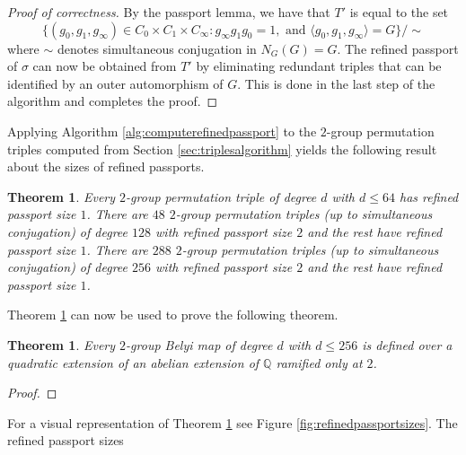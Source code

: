 \documentclass{dcthesis}
\newcommand{\QQ}{\mathbb Q}
\numberwithin{equation}{section}
\newtheorem{theorem}[equation]{Theorem}
\theoremstyle{definition}
\theoremstyle{remark}
\begin{document}
{{{\begin{proof}[Proof of correctness]
      By the passport lemma,
      we have that $T'$ is equal to the set
      \begin{equation}
        \label{eqn:innerauts}
        \{
          (g_0,g_1,g_\infty)\in C_0\times C_1\times C_\infty :
          g_\infty g_1 g_0 = 1,\text{ and }
          \langle g_0,g_1,g_\infty\rangle = G
        \}/\!\sim
      \end{equation}
      where $\sim$ denotes simultaneous conjugation in
      $N_G(G)=G$.
      The refined passport of $\sigma$
      can now be obtained from $T'$
      by eliminating redundant triples that can
      be identified by an outer automorphism of $G$.
      This is done in the last step of the algorithm
      and completes the proof.
    \end{proof}
    Applying
    Algorithm \ref{alg:computerefinedpassport}
    to the $2$-group permutation triples
    computed from Section \ref{sec:triplesalgorithm}
    yields the following result about the
    sizes of refined passports.
    \begin{theorem}
      \label{thm:refinedpassportsizes}
      Every
      $2$-group permutation triple
      of degree $d$ with $d\leq 64$
      has refined passport size $1$.
      There are $48$ $2$-group permutation triples
      (up to simultaneous conjugation)
      of degree $128$ with refined passport size $2$
      and the rest have refined passport size $1$.
      There are $288$ $2$-group permutation triples
      (up to simultaneous conjugation)
      of degree $256$ with refined passport size $2$
      and the rest have refined passport size $1$.
    \end{theorem}
    Theorem \ref{thm:refinedpassportsizes}
    can now be used to prove the following theorem.
    \begin{theorem}
      \label{thm:rerefined}
      Every $2$-group Belyi map
      of degree $d$ with $d\leq 256$
      is defined over a quadratic
      extension of an abelian extension of $\QQ$
      ramified only at $2$.
    \end{theorem}
    \begin{proof}
    \end{proof}
    For a visual representation of Theorem
    \ref{thm:refinedpassportsizes} see
    Figure \ref{fig:refinedpassportsizes}.
    The refined passport sizes
}}}
\end{document}
